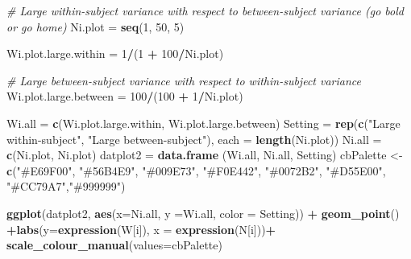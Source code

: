 \documentclass[
]{book}
\newenvironment{Shaded}{\begin{snugshade}}{\end{snugshade}}
\newcommand{\CommentTok}[1]{\textcolor[rgb]{0.56,0.35,0.01}{\textit{#1}}}
\newcommand{\DataTypeTok}[1]{\textcolor[rgb]{0.13,0.29,0.53}{#1}}
\newcommand{\DecValTok}[1]{\textcolor[rgb]{0.00,0.00,0.81}{#1}}
\newcommand{\KeywordTok}[1]{\textcolor[rgb]{0.13,0.29,0.53}{\textbf{#1}}}
\newcommand{\NormalTok}[1]{#1}
\newcommand{\OperatorTok}[1]{\textcolor[rgb]{0.81,0.36,0.00}{\textbf{#1}}}
\newcommand{\StringTok}[1]{\textcolor[rgb]{0.31,0.60,0.02}{#1}}
\begin{document}
\begin{Shaded}
\begin{Highlighting}[]
\CommentTok{\# Large within{-}subject variance with respect to between{-}subject variance (go bold or go home)}
\NormalTok{Ni.plot =}\StringTok{ }\KeywordTok{seq}\NormalTok{(}\DecValTok{1}\NormalTok{, }\DecValTok{50}\NormalTok{, }\DecValTok{5}\NormalTok{)}

\NormalTok{Wi.plot.large.within =}\StringTok{ }\DecValTok{1}\OperatorTok{/}\NormalTok{(}\DecValTok{1} \OperatorTok{+}\StringTok{ }\DecValTok{100}\OperatorTok{/}\NormalTok{Ni.plot)}

\CommentTok{\# Large between{-}subject variance with respect to within{-}subject variance}
\NormalTok{Wi.plot.large.between =}\StringTok{ }\DecValTok{100}\OperatorTok{/}\NormalTok{(}\DecValTok{100} \OperatorTok{+}\StringTok{ }\DecValTok{1}\OperatorTok{/}\NormalTok{Ni.plot)}

\NormalTok{Wi.all =}\StringTok{ }\KeywordTok{c}\NormalTok{(Wi.plot.large.within, Wi.plot.large.between)}
\NormalTok{Setting =}\StringTok{ }\KeywordTok{rep}\NormalTok{(}\KeywordTok{c}\NormalTok{(}\StringTok{"Large within{-}subject"}\NormalTok{, }\StringTok{"Large between{-}subject"}\NormalTok{), }\DataTypeTok{each =} \KeywordTok{length}\NormalTok{(Ni.plot))}
\NormalTok{Ni.all =}\StringTok{ }\KeywordTok{c}\NormalTok{(Ni.plot, Ni.plot)}
\NormalTok{datplot2 =}\StringTok{ }\KeywordTok{data.frame}\NormalTok{ (Wi.all, Ni.all, Setting)}
\NormalTok{cbPalette <{-}}\StringTok{ }\KeywordTok{c}\NormalTok{(}\StringTok{"\#E69F00"}\NormalTok{, }\StringTok{"\#56B4E9"}\NormalTok{, }\StringTok{"\#009E73"}\NormalTok{, }\StringTok{"\#F0E442"}\NormalTok{, }\StringTok{"\#0072B2"}\NormalTok{, }\StringTok{"\#D55E00"}\NormalTok{, }\StringTok{"\#CC79A7"}\NormalTok{,}\StringTok{"\#999999"}\NormalTok{)}

\KeywordTok{ggplot}\NormalTok{(datplot2, }\KeywordTok{aes}\NormalTok{(}\DataTypeTok{x=}\NormalTok{Ni.all, }\DataTypeTok{y =}\NormalTok{Wi.all, }\DataTypeTok{color =}\NormalTok{ Setting)) }\OperatorTok{+}\StringTok{ }\KeywordTok{geom\_point}\NormalTok{() }\OperatorTok{+}\KeywordTok{labs}\NormalTok{(}\DataTypeTok{y=}\KeywordTok{expression}\NormalTok{(W[i]), }\DataTypeTok{x =} \KeywordTok{expression}\NormalTok{(N[i]))}\OperatorTok{+}\StringTok{ }\KeywordTok{scale\_colour\_manual}\NormalTok{(}\DataTypeTok{values=}\NormalTok{cbPalette)}
\end{Highlighting}
\end{Shaded}
\end{document}
